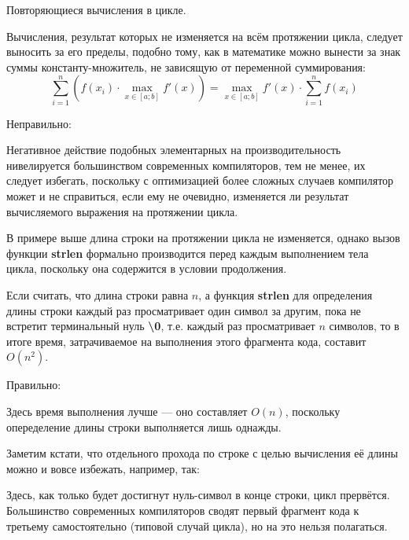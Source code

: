 \begin{typerror}
	\label{TE_duplicate-calculations-for}
	Повторяющиеся вычисления в цикле.
	
	Вычисления, результат которых не изменяется на всём протяжении цикла, следует выносить за его пределы,
	подобно тому, как в математике можно вынести за знак суммы константу-множитель, не зависящую от переменной суммирования:
	$$
		\sum_{i=1}^{n}\left(f(x_i)\cdot\max\limits_{x\in[a;b]}f'(x)\right) = \max\limits_{x\in[a;b]}f'(x)\cdot\sum_{i=1}^{n}f(x_i)
	$$


	Неправильно:

	Негативное действие подобных элементарных на производительность нивелируется большинством современных компиляторов,
	тем не менее, их следует избегать, поскольку с оптимизацией более сложных случаев компилятор может и не справиться,
	если ему не очевидно, изменяется ли результат вычисляемого выражения на протяжении цикла.

	В примере выше длина строки на протяжении цикла не изменяется,
	однако вызов функции \textbf{strlen} формально производится перед каждым выполнением тела цикла,
	поскольку она содержится в условии продолжения.

	Если считать, что длина строки равна $n$,
	а функция \textbf{strlen} для определения длины строки каждый раз просматривает один символ за другим,
	пока не встретит терминальный нуль \textbf{\textbackslash0}, т.е. каждый раз просматривает $n$ символов,
	то в итоге время, затрачиваемое на выполнения этого фрагмента кода, составит $O(n^2)$.

	Правильно:

	Здесь время выполнения лучше --- оно составляет $O(n)$, поскольку опеределение длины строки выполняется лишь однажды.
	
	Заметим кстати, что отдельного прохода по строке с целью вычисления её длины можно и вовсе избежать, например, так:

	Здесь, как только будет достигнут нуль-символ в конце строки, цикл прервётся.
	Большинство современных компиляторов сводят первый фрагмент кода к третьему самостоятельно (типовой случай цикла),
	но на это нельзя полагаться.

\end{typerror}
